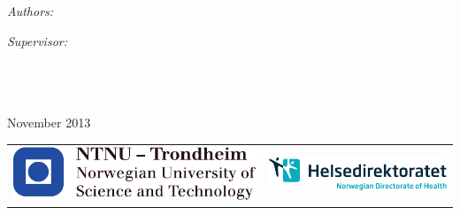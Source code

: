 \documentclass[11pt, a4paper, oneside]{Thesis} %
\begin{document}
\begin{titlepage}
\begin{center}

\textsc{\LARGE \univname}\\[1.5cm] %

\HRule \\[0.4cm] %
{\huge \bfseries \ttitle}\\[0.4cm] %
\HRule \\[1.5cm] %
 
\begin{minipage}{0.4\textwidth}
\begin{flushleft} \large
\emph{Authors:}\\
\authornames %
\end{flushleft}
\end{minipage}
\begin{minipage}{0.4\textwidth}
\begin{flushright} \large
\emph{Supervisor:} \\
\supname %
\end{flushright}
\end{minipage}\\[3cm]
\groupname\\\deptname\\[2cm] %
 
{\large November 2013}\\[4cm] %


\begin{tabular}{lr}
   \includegraphics[scale=0.6]{./Figures/NTNU-logo.pdf} &
   \includegraphics[scale=0.9]{./Figures/HDIR-LOGO-HORISONTAL-ENG-CMYK.pdf} \\
\end{tabular}

\end{center}

\end{titlepage}
\clearpage %
\end{document}
